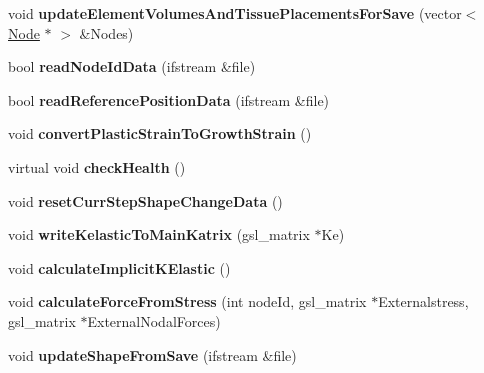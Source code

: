 \begin{DoxyCompactItemize}
\item 
\hypertarget{classShapeBase_a6e36c21c648f06a0e0693b3c34472fe5}{}void {\bfseries update\+Element\+Volumes\+And\+Tissue\+Placements\+For\+Save} (vector$<$ \hyperlink{classNode}{Node} $\ast$ $>$ \&Nodes)\label{classShapeBase_a6e36c21c648f06a0e0693b3c34472fe5}

\item 
\hypertarget{classShapeBase_acbd21b1daca4a94c5919147ae8c463d6}{}bool {\bfseries read\+Node\+Id\+Data} (ifstream \&file)\label{classShapeBase_acbd21b1daca4a94c5919147ae8c463d6}

\item 
\hypertarget{classShapeBase_a37a16216b042486dfdcbb16d8366eb7f}{}bool {\bfseries read\+Reference\+Position\+Data} (ifstream \&file)\label{classShapeBase_a37a16216b042486dfdcbb16d8366eb7f}

\item 
\hypertarget{classShapeBase_a78d45ea18373ce5e21b7567e9e6bdabc}{}void {\bfseries convert\+Plastic\+Strain\+To\+Growth\+Strain} ()\label{classShapeBase_a78d45ea18373ce5e21b7567e9e6bdabc}

\item 
\hypertarget{classShapeBase_adb6927dd05e3f6aa1c5ac5d32a30b5da}{}virtual void {\bfseries check\+Health} ()\label{classShapeBase_adb6927dd05e3f6aa1c5ac5d32a30b5da}

\item 
\hypertarget{classShapeBase_a3c08833714950163efbf15f9b1c26765}{}void {\bfseries reset\+Curr\+Step\+Shape\+Change\+Data} ()\label{classShapeBase_a3c08833714950163efbf15f9b1c26765}

\item 
\hypertarget{classShapeBase_af6cd6e943b529eca33c92723893bf991}{}void {\bfseries write\+Kelastic\+To\+Main\+Katrix} (gsl\+\_\+matrix $\ast$Ke)\label{classShapeBase_af6cd6e943b529eca33c92723893bf991}

\item 
\hypertarget{classShapeBase_a922c41864d4826725cc72089046f818c}{}void {\bfseries calculate\+Implicit\+K\+Elastic} ()\label{classShapeBase_a922c41864d4826725cc72089046f818c}

\item 
\hypertarget{classShapeBase_a6a9f16ddb320974584323d78ca4aec9c}{}void {\bfseries calculate\+Force\+From\+Stress} (int node\+Id, gsl\+\_\+matrix $\ast$Externalstress, gsl\+\_\+matrix $\ast$External\+Nodal\+Forces)\label{classShapeBase_a6a9f16ddb320974584323d78ca4aec9c}

\item 
\hypertarget{classShapeBase_ae5a4fc509efc12d24cf90ea71dee3c27}{}void {\bfseries update\+Shape\+From\+Save} (ifstream \&file)\label{classShapeBase_ae5a4fc509efc12d24cf90ea71dee3c27}


\end{DoxyCompactItemize}
